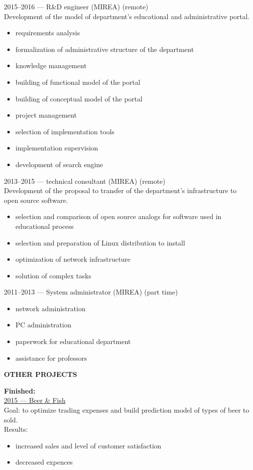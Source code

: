 \documentclass[a4paper,12pt,fullpage]{article}
\begin{document}
2015--2016 --- R\&D engineer (MIREA) (remote)\\
Development of the model of department's educational and administrative portal.
\begin{itemize}
	\item requirements analysis
	\item formalization of administrative structure of the department
	\item knowledge management
	\item building of functional model of the portal
	\item building of conceptual model of the portal
	\item project management
	\item selection of implementation tools
	\item implementation supervision
	\item development of search engine
\end{itemize}

2013--2015 --- technical consultant (MIREA) (remote)\\
Development of the proposal to transfer of the department's infrastructure to 
open source software.
\begin{itemize}
	\item selection and comparison of open source analogs for software used 
in educational process
	\item selection and preparation of Linux distribution to install
	\item optimization of network infrastructure
	\item solution of complex tasks\\
\end{itemize}

2011--2013 --- System administrator (MIREA) (part time)
\begin{itemize}
	\item network administration
	\item PC administration
	\item paperwork for educational department
	\item assistance for professors
\end{itemize}

\begin{center}
	\textbf{OTHER PROJECTS}
\end{center}

\textbf{Finished:}\\
\underline{2015 --- Beer \& Fish}\\
Goal: to optimize trading expenses and build prediction model of types of beer 
to sold.\\
Results:
\begin{itemize}
	\item increased sales and level of customer satisfaction
	\item decreased expences\\
\end{itemize}
\end{document}
